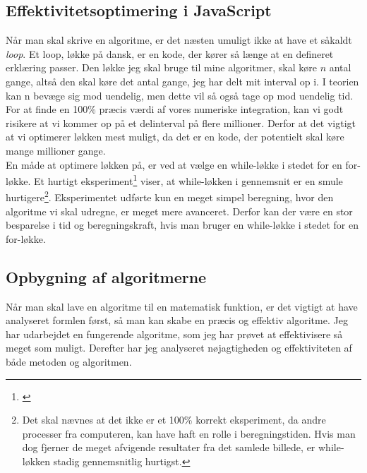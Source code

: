 \documentclass[12pt]{article}
\numberwithin{equation}{section}
\begin{document}
\subsection{Effektivitetsoptimering i JavaScript}
Når man skal skrive en algoritme, er det næsten umuligt ikke at have et såkaldt \emph{loop}. Et loop, løkke på dansk, er en kode, der kører så længe at en defineret erklæring passer. Den løkke jeg skal bruge til mine algoritmer, skal køre $n$ antal gange, altså den skal køre det antal gange, jeg har delt mit interval op i. I teorien kan n bevæge sig mod uendelig, men dette vil så også tage op mod uendelig tid. For at finde en 100\% præcis værdi af vores numeriske integration, kan vi godt risikere at vi kommer op på et delinterval på flere millioner. Derfor at det vigtigt at vi optimerer løkken mest muligt, da det er en kode, der potentielt skal køre mange millioner gange.\\
En måde at optimere løkken på, er ved at vælge en while-løkke i stedet for en for-løkke. Et hurtigt eksperiment\footnote{\cite{forvswhile}} viser, at while-løkken i gennemsnit er en smule hurtigere\footnote{Det skal nævnes at det ikke er et 100\% korrekt eksperiment, da andre processer fra computeren, kan have haft en rolle i beregningstiden. Hvis man dog fjerner de meget afvigende resultater fra det samlede billede, er while-løkken stadig gennemsnitlig hurtigst.}. Eksperimentet udførte kun en meget simpel beregning, hvor den algoritme vi skal udregne, er meget mere avanceret. Derfor kan der være en stor besparelse i tid og beregningskraft, hvis man bruger en while-løkke i stedet for en for-løkke.


\subsection{Opbygning af algoritmerne}
Når man skal lave en algoritme til en matematisk funktion, er det vigtigt at have analyseret formlen først, så man kan skabe en præcis og effektiv algoritme. Jeg har udarbejdet en fungerende algoritme, som jeg har prøvet at effektivisere så meget som muligt. Derefter har jeg analyseret nøjagtigheden og effektiviteten af både metoden og algoritmen.
\end{document}
